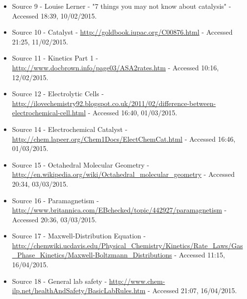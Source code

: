 \begin{itemize}
\item Source 9 - Louise Lerner - "7 things you may not know about catalysis" - Accessed 18:39, 10/02/2015.

\item Source 10 - Catalyst - \url{http://goldbook.iupac.org/C00876.html} - Accessed 21:25, 11/02/2015.

\item Source 11 - Kinetics Part 1 - \url{http://www.docbrown.info/page03/ASA2rates.htm} - Accessed 10:16, 12/02/2015.

\item Source 12 - Electrolytic Cells - \url{http://ilovechemistry92.blogspot.co.uk/2011/02/difference-between-electrochemical-cell.html} - Accessed 16:40, 01/03/2015.

\item Source 14 - Electrochemical Catalyst - \url{http://chem.lapeer.org/Chem1Docs/ElectChemCat.html} - Accessed 16:46, 01/03/2015.

\item Source 15 - Octahedral Molecular Geometry - \url{http://en.wikipedia.org/wiki/Octahedral_molecular_geometry} - Accessed 20:34, 03/03/2015.

\item Source 16 - Paramagnetism - \url{http://www.britannica.com/EBchecked/topic/442927/paramagnetism} - Accessed 20:36, 03/03/2015.

\item Source 17 - Maxwell-Distribution Equation - \url{http://chemwiki.ucdavis.edu/Physical_Chemistry/Kinetics/Rate_Laws/Gas_Phase_Kinetics/Maxwell-Boltzmann_Distributions} - Accessed 11:15, 16/04/2015.

\item Source 18 - General lab safety - \url{http://www.chem-ilp.net/healthAndSafety/BasicLabRules.htm} - Accessed 21:07, 16/04/2015.





\end{itemize}





